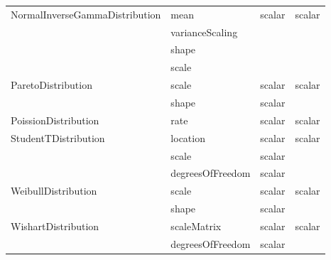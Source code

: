 \documentclass[draftspec]{sbmlpkgspec}
\begin{document}
\begin{longtable}[c]{ l l l l }
NormalInverseGammaDistribution & mean & scalar & scalar\\
                                                       &
                                                       varianceScaling
                                                       & \\
                                                       & shape &\\
                                                       & scale & \\\midrule
ParetoDistribution & scale & scalar & scalar \\
                                & shape & scalar & \\\midrule
PoissionDistribution & rate & scalar & scalar \\\midrule
StudentTDistribution & location & scalar & scalar \\
                                    & scale & scalar & \\
                                    & degreesOfFreedom & scalar &
                                    \\\midrule
WeibullDistribution  & scale & scalar & scalar \\
                                     & shape & scalar & \\\midrule
WishartDistribution & scaleMatrix & scalar & scalar \\
                                  & degreesOfFreedom & scalar & \\
\end{longtable}


\end{document}
